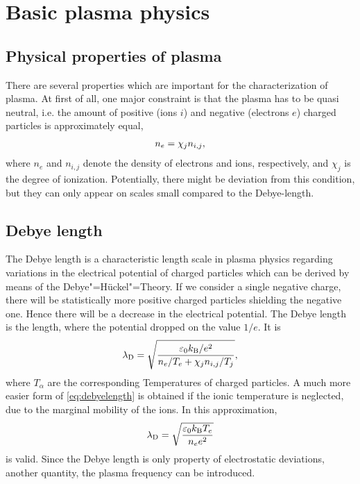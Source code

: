 \section{Basic plasma physics}\label{sec:grundlagen}

\subsection{Physical properties of plasma}\label{subsec:physicalproperties}

There are several properties which are important for the characterization of plasma. At first of all, one major constraint is that the plasma has to be quasi neutral, i.e. the amount of positive (ions $i$) and negative (electrons $e$) charged particles is approximately equal,
\begin{align}
	\label{eq:quasineutral}
	n_e = \chi_j n_{i,j} \scriptsize{,}
\end{align}
where $n_e$ and $n_{i,j}$ denote the density of electrons and ions, respectively, and $\chi_j$ is the degree of ionization. Potentially, there might be deviation from this condition, but they can only appear on scales small compared to the Debye-length.

\subsection{Debye length}\label{subsec:debyelength}

The Debye length is a characteristic length scale in plasma physics regarding variations in the electrical potential of charged particles which can be derived by means of the Debye"=Hückel"=Theory. If we consider a single negative charge, there will be statistically more positive charged particles shielding the negative one. Hence there will be a decrease in the electrical potential. The Debye length is the length, where the potential dropped on the value $1/e$. It is
\begin{align}
	\label{eq:debyelength}
	\lambda_{\text{\scriptsize D}} = \sqrt{\frac{\varepsilon_0 k_{\text{\scriptsize B}}/e^2}{n_e/T_e + \chi_j n_{i,j}/T_j}} \scriptsize{,}
\end{align}
where $T_\alpha$ are the corresponding Temperatures of charged particles. A much more easier form of \eqref{eq:debyelength} is obtained if the ionic temperature is neglected, due to the marginal mobility of the ions. In this approximation,
\begin{align}
	\label{eq:debyelengthsimple}
	\lambda_{\text{\scriptsize D}} = \sqrt{\frac{\varepsilon_0 k_{\text{\scriptsize B}} T_e}{n_e e^2}}
\end{align}
is valid. Since the Debye length is only property of electrostatic deviations, another quantity, the plasma frequency can be introduced.

